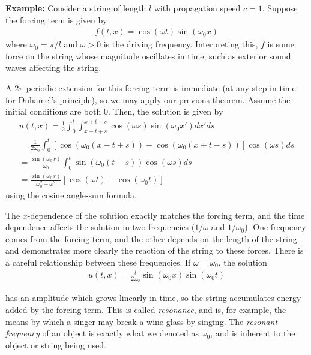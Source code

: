 \documentclass{article}
\begin{document}
	
	\vspace{0.25 cm}
	
	\textbf{Example:} Consider a string of length $l$ with propagation speed $c=1$. Suppose the forcing term is given by 
	\begin{align*}
		f(t,x) = \cos(\omega t) \sin(\omega_0 x)
	\end{align*}
	where $\omega_0 = \pi /l$ and $\omega > 0$ is the driving frequency. Interpreting this, $f$ is some force on the string whose magnitude oscillates in time, such as exterior sound waves affecting the string. 
	
	
	 A $2\pi$-periodic extension for this forcing term is immediate (at any step in time for Duhamel's principle), so we may apply our previous theorem. Assume the initial conditions are both $0$. Then, the solution is given by 
	\begin{align*}
		u(t,x) = \frac{1}{2} \int_{0}^{t} \int_{x-t+s}^{x+t-s} \cos(\omega s) \sin(\omega_0 x')dx'ds \\ 
		 = \frac{1}{2\omega_0} \int_{0}^{t} \left[ \cos(\omega_0 ( x-t+s)) - \cos(\omega_0(x+t-s)) \right] \cos(\omega s) ds \\
		 = \frac{\sin(\omega_0 x)}{\omega_0} \int_{0}^{t} \sin(\omega_0(t-s))\cos(\omega s)ds\\
		 = \frac{\sin(\omega_0 x)}{\omega_{0}^{2} - \omega^{2}} \left[ \cos(\omega t) - \cos(\omega_0 t)\right]
	\end{align*}
	using the cosine angle-sum formula.
	
	The $x$-dependence of the solution exactly matches the forcing term, and the time dependence affects the solution in two frequencies $(1/\omega$ and $1/\omega_0$). One frequency comes from the forcing term, and the other depends on the length of the string and demonstrates more clearly the reaction of the string to these forces. There is a careful relationship between these frequencies. If $\omega = \omega_0$, the solution 
	\begin{align*}
		u(t,x) = \frac{t}{2\omega_0} \sin(\omega_0 x) \sin(\omega_0 t)
	\end{align*} 
	
	has an amplitude which grows linearly in time, so the string accumulates energy added by the forcing term. This is called \textit{resonance}, and is, for example, the means by which a singer may break a wine glass by singing. The \textit{resonant frequency} of an object is exactly what we denoted as $\omega_0$, and is inherent to the object or string being used. 
	
\end{document}
